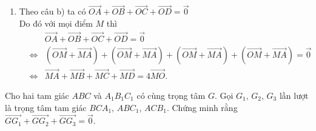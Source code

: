 \begin{bt}
{\begin{enumerate}
			Mặt khác $O $ là trung điểm $IJ$ nên $\overrightarrow{OI}+\overrightarrow{OJ}=\overrightarrow 0 $.\\
			Suy ra $\overrightarrow{OA}+\overrightarrow{OB}+\overrightarrow{OC}+\overrightarrow{OD}=2\left(\overrightarrow{OI}+\overrightarrow{OJ}\right)=\overrightarrow 0 $.
			\item Theo câu b) ta có $\overrightarrow{OA}+\overrightarrow{OB}+\overrightarrow{OC}+\overrightarrow{OD}=\overrightarrow 0 $ \\
			Do đó với mọi điểm $M$ thì
			\begin{eqnarray*}
				& & \overrightarrow{OA}+\overrightarrow{OB}+\overrightarrow{OC}+\overrightarrow{OD}=\overrightarrow 0\\
				&\Leftrightarrow& \left(\overrightarrow{OM}+\overrightarrow{MA}\right)+\left(\overrightarrow{OM}+\overrightarrow{MA}\right)+\left(\overrightarrow{OM}+\overrightarrow{MA}\right)+\left(\overrightarrow{OM}+\overrightarrow{MA}\right)=\overrightarrow 0\\ 
				&\Leftrightarrow& \overrightarrow{MA}+\overrightarrow{MB}+\overrightarrow{MC}+\overrightarrow{MD}=4\overrightarrow{MO}.
			\end{eqnarray*}
		\end{enumerate}
	}
\end{bt}

\begin{bt}%
	Cho hai tam giác $ABC$ và $A_1B_1C_1$ có cùng trọng tâm $G$. Gọi $G_1,\,G_2,\,G_3$ lần lượt là trọng tâm tam giác $BC{A_1},\,AB{C_1},\,AC{B_1}$. Chứng minh rằng $\overrightarrow{G{G_1}}+\overrightarrow{G{G_2}}+\overrightarrow{G{G_3}}=\overrightarrow 0 $.
\end{bt}


